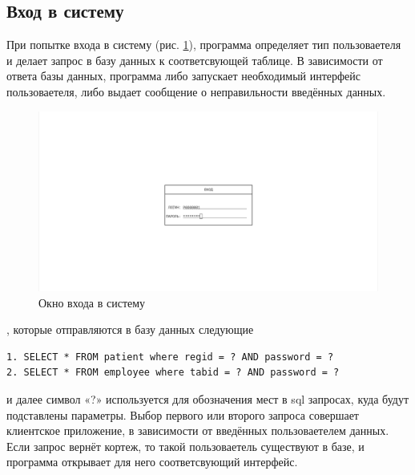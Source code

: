 \documentclass[14pt,a4paper,russian]{extreport}
\begin{document}
\subsection{Вход в систему}
При попытке входа в систему (рис. \ref{fig:login}), программа определяет тип пользоваетеля и делает запрос в базу данных к соответсвующей таблице. В зависимости от ответа базы данных, программа либо запускает необходимый интерфейс пользоваетеля, либо выдает сообщение о неправильности введённых данных.
\begin{figure}[h!]
        \includegraphics[width=\textwidth]{prog_int/login-screen}
        \caption{Окно входа в систему}
        \label{fig:login}
\end{figure}
, которые отправляются в базу данных следующие 
\begin{lstlisting}[style=csql] 
1. SELECT * FROM patient where regid = ? AND password = ?
2. SELECT * FROM employee where tabid = ? AND password = ?
\end{lstlisting}
 и далее символ «?» используется для обозначения мест в sql запросах, куда будут подставлены параметры.
Выбор первого или второго запроса совершает клиентское приложение, в зависимости от введённых пользоваетелем данных.
Если запрос вернёт кортеж, то такой пользоваетель существуют в базе, и программа открывает для него соответсвующий интерфейс.
\end{document}
